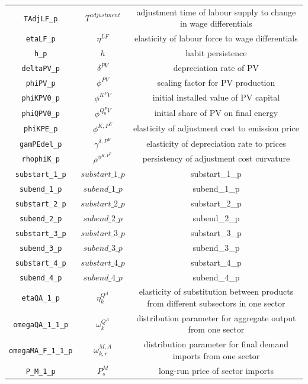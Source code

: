 \begin{center}
\begin{longtable}{ccc}
\texttt{TAdjLF\_p} & ${T^{adjustment}}$ & adjustment time of labour supply to change in wage differentials\\
\texttt{etaLF\_p} & ${\eta^{LF}}$ & elasticity of labour force to wage differentials\\
\texttt{h\_p} & ${h}$ & habit persistence\\
\texttt{deltaPV\_p} & ${\delta^{PV}}$ & depreciation rate of PV\\
\texttt{phiPV\_p} & ${\phi^{PV}}$ & scaling factor for PV production\\
\texttt{phiKPV0\_p} & ${\phi^{K^PV}}$ & initial installed value of PV capital\\
\texttt{phiQPV0\_p} & ${\phi^{Q_0^PV}}$ & initial share of PV on final energy\\
\texttt{phiKPE\_p} & ${\phi^{K,P^E}}$ & elasticity of adjustment cost to emission price\\
\texttt{gamPEdel\_p} & ${\gamma^{\delta,P^E}}$ & elasticity of depreciation rate to prices\\
\texttt{rhophiK\_p} & ${\rho^{\phi^{K,P^E}}}$ & persistency of adjustment cost curvature\\
\texttt{substart\_1\_p} & $substart\_1\_p$ & substart\_1\_p\\
\texttt{subend\_1\_p} & $subend\_1\_p$ & subend\_1\_p\\
\texttt{substart\_2\_p} & $substart\_2\_p$ & substart\_2\_p\\
\texttt{subend\_2\_p} & $subend\_2\_p$ & subend\_2\_p\\
\texttt{substart\_3\_p} & $substart\_3\_p$ & substart\_3\_p\\
\texttt{subend\_3\_p} & $subend\_3\_p$ & subend\_3\_p\\
\texttt{substart\_4\_p} & $substart\_4\_p$ & substart\_4\_p\\
\texttt{subend\_4\_p} & $subend\_4\_p$ & subend\_4\_p\\
\texttt{etaQA\_1\_p} & ${\eta^{Q^A}_{k}}$ & elasticity of substitution between products from different subsectors in one sector\\
\texttt{omegaQA\_1\_1\_p} & ${\omega^{Q^A}_{k}}$ & distribution parameter for aggregate output from one sector\\
\texttt{omegaMA\_F\_1\_1\_p} & ${\omega^{M,A}_{k,r}}$ & distribution parameter for final demand imports from one sector\\
\texttt{P\_M\_1\_p} & ${P^{M}_{s}}$ & long-run price of sector imports\\

\end{longtable}
\end{center}
